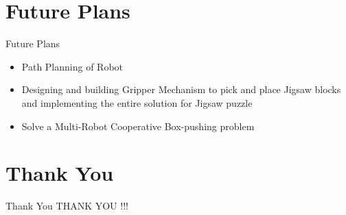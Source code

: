 \documentclass[10pt,a4paper]{beamer}
\begin{document}
\section{Future Plans}
\begin{frame}{Future Plans}
	\begin{itemize}
		\item Path Planning of Robot\pause
		\item Designing and building Gripper Mechanism to pick and place Jigsaw blocks and implementing the entire solution for Jigsaw puzzle\pause
		\item Solve a Multi-Robot Cooperative Box-pushing problem
	\end{itemize}
\end{frame}


\section{Thank You}
\begin{frame}{Thank You}
	\centering THANK YOU !!!
\end{frame}
\end{document}
